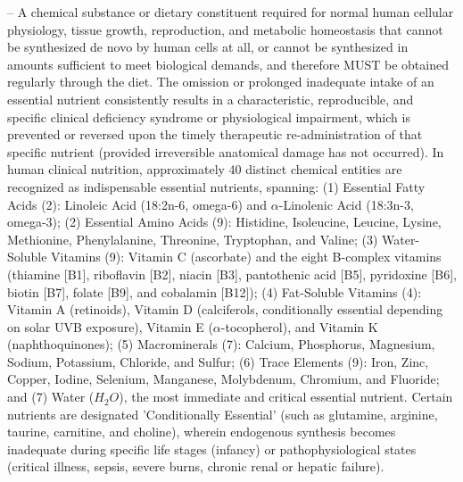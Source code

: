 -- A chemical substance or dietary constituent required for normal human cellular physiology, tissue growth, reproduction, and metabolic homeostasis that cannot be synthesized de novo by human cells at all, or cannot be synthesized in amounts sufficient to meet biological demands, and therefore MUST be obtained regularly through the diet. The omission or prolonged inadequate intake of an essential nutrient consistently results in a characteristic, reproducible, and specific clinical deficiency syndrome or physiological impairment, which is prevented or reversed upon the timely therapeutic re-administration of that specific nutrient (provided irreversible anatomical damage has not occurred). In human clinical nutrition, approximately 40 distinct chemical entities are recognized as indispensable essential nutrients, spanning: (1) Essential Fatty Acids (2): Linoleic Acid (18:2n-6, omega-6) and $\alpha$-Linolenic Acid (18:3n-3, omega-3); (2) Essential Amino Acids (9): Histidine, Isoleucine, Leucine, Lysine, Methionine, Phenylalanine, Threonine, Tryptophan, and Valine; (3) Water-Soluble Vitamins (9): Vitamin C (ascorbate) and the eight B-complex vitamins (thiamine [B1], riboflavin [B2], niacin [B3], pantothenic acid [B5], pyridoxine [B6], biotin [B7], folate [B9], and cobalamin [B12]); (4) Fat-Soluble Vitamins (4): Vitamin A (retinoids), Vitamin D (calciferols, conditionally essential depending on solar UVB exposure), Vitamin E ($\alpha$-tocopherol), and Vitamin K (naphthoquinones); (5) Macrominerals (7): Calcium, Phosphorus, Magnesium, Sodium, Potassium, Chloride, and Sulfur; (6) Trace Elements (9): Iron, Zinc, Copper, Iodine, Selenium, Manganese, Molybdenum, Chromium, and Fluoride; and (7) Water ($H_2O$), the most immediate and critical essential nutrient. Certain nutrients are designated 'Conditionally Essential' (such as glutamine, arginine, taurine, carnitine, and choline), wherein endogenous synthesis becomes inadequate during specific life stages (infancy) or pathophysiological states (critical illness, sepsis, severe burns, chronic renal or hepatic failure).

